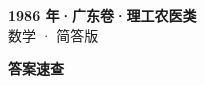 \documentclass[zihao=-4, a4paper]{ctexart}
\begin{document}
\begin{center}
  {\Large\bfseries 1986 年·广东卷·理工农医类}\\[4pt]
  {\large 数学 · 简答版}
\end{center}
\medskip
{}

\clearpage
{}
\begin{center}{\Large\bfseries 答案速查}\end{center}
\medskip

\end{document}
